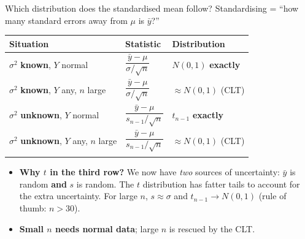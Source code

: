 \documentclass[
  11pt,
  ignorenonframetext,
  aspectratio=169,
]{beamer}
\newcounter{none} %
\providecommand{\tightlist}{%
  \setlength{\itemsep}{0pt}\setlength{\parskip}{0pt}}
\begin{document}
\begin{frame}{Which distribution does the standardised mean follow?}
\protect{}\label{which-distribution-does-the-standardised-mean-follow}
Standardising = ``how many standard errors away from \(\mu\) is
\(\bar y\)?''

{\def\LTcaptype{none} %
\begin{longtable}[]{@{}
  >{\raggedright\arraybackslash}p{}
  >{\raggedright\arraybackslash}p{}
  >{\raggedright\arraybackslash}p{}@{}}
\toprule\noalign{}
\begin{minipage}[b]{\linewidth}\raggedright
Situation
\end{minipage} & \begin{minipage}[b]{\linewidth}\raggedright
Statistic
\end{minipage} & \begin{minipage}[b]{\linewidth}\raggedright
Distribution
\end{minipage} \\
\midrule\noalign{}
\endhead
\(\sigma^2\) \textbf{known}, \(Y\) normal &
\(\dfrac{\bar y-\mu}{\sigma/\sqrt n}\) & \(N(0,1)\) \textbf{exactly} \\
\(\sigma^2\) \textbf{known}, \(Y\) any, \(n\) large &
\(\dfrac{\bar y-\mu}{\sigma/\sqrt n}\) & \(\approx N(0,1)\) (CLT) \\
\(\sigma^2\) \textbf{unknown}, \(Y\) normal &
\(\dfrac{\bar y-\mu}{s_{n-1}/\sqrt n}\) & \(t_{n-1}\)
\textbf{exactly} \\
\(\sigma^2\) \textbf{unknown}, \(Y\) any, \(n\) large &
\(\dfrac{\bar y-\mu}{s_{n-1}/\sqrt n}\) & \(\approx N(0,1)\) (CLT) \\
\bottomrule\noalign{}
\end{longtable}
}

\begin{itemize}
\tightlist
\item
  \textbf{Why \(t\) in the third row?} We now have \emph{two} sources of
  uncertainty: \(\bar y\) is random \textbf{and} \(s\) is random. The
  \(t\) distribution has fatter tails to account for the extra
  uncertainty. For large \(n\), \(s\approx\sigma\) and
  \(t_{n-1}\to N(0,1)\) (rule of thumb: \(n>30\)).
\item
  \textbf{Small \(n\) needs normal data}; large \(n\) is rescued by the
  CLT.
\end{itemize}
\end{frame}
\end{document}
